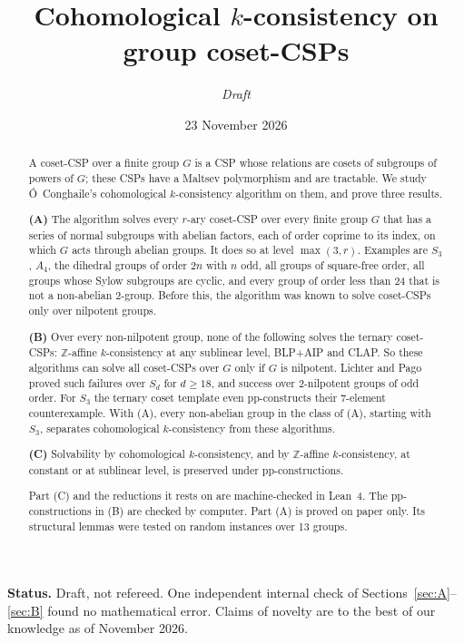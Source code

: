 \documentclass[11pt]{article}
\title{Cohomological $k$-consistency on group coset-CSPs}
\author{\emph{Draft}}
\date{23 November 2026}
\theoremstyle{definition}
\theoremstyle{remark}
\newcommand{\Z}{\mathbb Z}
\begin{document}
\maketitle

\begin{abstract}
A coset-CSP over a finite group $G$ is a CSP whose relations are cosets of
subgroups of powers of $G$; these CSPs have a Maltsev polymorphism and are
tractable. We study \'O~Conghaile's cohomological $k$-consistency algorithm on
them, and prove three results.

\textbf{(A)} The algorithm solves every $r$-ary coset-CSP over every finite
group $G$ that has a series of normal subgroups with abelian factors, each of
order coprime to its index, on which $G$ acts through abelian groups. It does so
at level $\max(3,r)$. Examples are $S_3$, $A_4$, the dihedral groups of order
$2n$ with $n$ odd, all groups of square-free order, all groups whose Sylow
subgroups are cyclic, and every group of order less than $24$ that is not a
non-abelian $2$-group. Before this, the algorithm was known to solve coset-CSPs
only over nilpotent groups.

\textbf{(B)} Over every non-nilpotent group, none of the following solves the
ternary coset-CSPs: $\Z$-affine $k$-consistency at any sublinear level, BLP+AIP and
CLAP. So these algorithms can solve all coset-CSPs over $G$ only if $G$ is
nilpotent. Lichter and Pago proved such failures over $S_d$ for $d\ge 18$, and
success over $2$-nilpotent groups of odd order. For $S_3$ the ternary coset template
even pp-constructs their 7-element counterexample. With (A), every non-abelian
group in the class of (A), starting with $S_3$, separates cohomological
$k$-consistency from these algorithms.

\textbf{(C)} Solvability by cohomological $k$-consistency, and by $\Z$-affine
$k$-consistency, at constant or at sublinear level, is preserved under
pp-constructions.

Part (C) and the reductions it rests on are machine-checked in Lean~4. The
pp-constructions in (B) are checked by computer. Part (A) is proved on paper
only. Its structural lemmas were tested on random instances over 13 groups.
\end{abstract}

\smallskip\noindent\textbf{Status.} Draft, not refereed. One independent
internal check of Sections~\ref{sec:A}--\ref{sec:B} found no mathematical
error. Claims of novelty are to the best of our knowledge as of November 2026.
\end{document}
